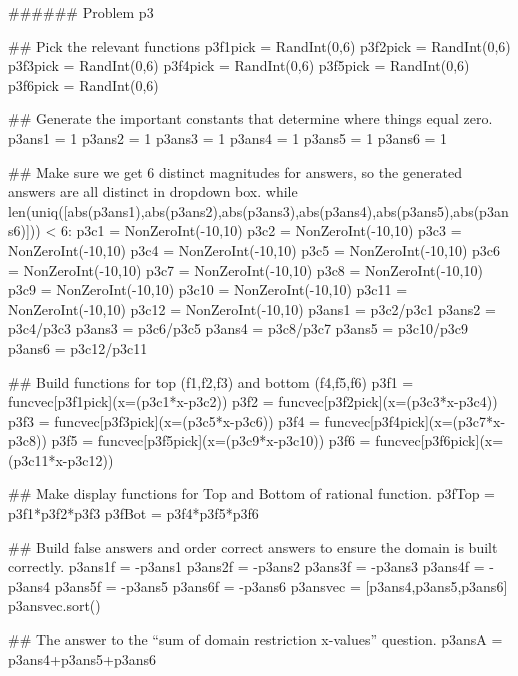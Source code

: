 \documentclass{ximera}
\begin{document}
\begin{sagesilent}
###### Problem p3

## Pick the relevant functions
p3f1pick = RandInt(0,6)
p3f2pick = RandInt(0,6)
p3f3pick = RandInt(0,6)
p3f4pick = RandInt(0,6)
p3f5pick = RandInt(0,6)
p3f6pick = RandInt(0,6)

## Generate the important constants that determine where things equal zero.
p3ans1 = 1
p3ans2 = 1
p3ans3 = 1
p3ans4 = 1
p3ans5 = 1
p3ans6 = 1

## Make sure we get 6 distinct magnitudes for answers, so the generated answers are all distinct in dropdown box.
while len(uniq([abs(p3ans1),abs(p3ans2),abs(p3ans3),abs(p3ans4),abs(p3ans5),abs(p3ans6)])) < 6:
    p3c1 = NonZeroInt(-10,10)
    p3c2 = NonZeroInt(-10,10)
    p3c3 = NonZeroInt(-10,10)
    p3c4 = NonZeroInt(-10,10)
    p3c5 = NonZeroInt(-10,10)
    p3c6 = NonZeroInt(-10,10)
    p3c7 = NonZeroInt(-10,10)
    p3c8 = NonZeroInt(-10,10)
    p3c9 = NonZeroInt(-10,10)
    p3c10 = NonZeroInt(-10,10)
    p3c11 = NonZeroInt(-10,10)
    p3c12 = NonZeroInt(-10,10)
    p3ans1 = p3c2/p3c1
    p3ans2 = p3c4/p3c3
    p3ans3 = p3c6/p3c5
    p3ans4 = p3c8/p3c7
    p3ans5 = p3c10/p3c9
    p3ans6 = p3c12/p3c11

## Build functions for top (f1,f2,f3) and bottom (f4,f5,f6)
p3f1 = funcvec[p3f1pick](x=(p3c1*x-p3c2))
p3f2 = funcvec[p3f2pick](x=(p3c3*x-p3c4))
p3f3 = funcvec[p3f3pick](x=(p3c5*x-p3c6))
p3f4 = funcvec[p3f4pick](x=(p3c7*x-p3c8))
p3f5 = funcvec[p3f5pick](x=(p3c9*x-p3c10))
p3f6 = funcvec[p3f6pick](x=(p3c11*x-p3c12))

## Make display functions for Top and Bottom of rational function.
p3fTop = p3f1*p3f2*p3f3
p3fBot = p3f4*p3f5*p3f6

## Build false answers and order correct answers to ensure the domain is built correctly.
p3ans1f = -p3ans1
p3ans2f = -p3ans2
p3ans3f = -p3ans3
p3ans4f = -p3ans4
p3ans5f = -p3ans5
p3ans6f = -p3ans6
p3ansvec = [p3ans4,p3ans5,p3ans6]
p3ansvec.sort()

## The answer to the ``sum of domain restriction x-values'' question.
p3ansA = p3ans4+p3ans5+p3ans6




\end{sagesilent}
\end{document}
